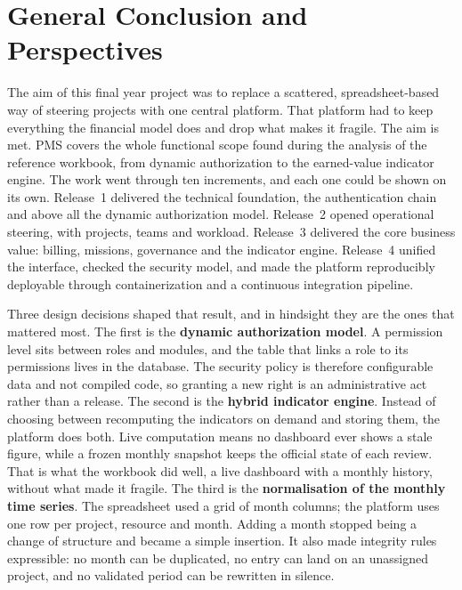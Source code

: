 \chapter*{General Conclusion and Perspectives}

The aim of this final year project was to replace a scattered, spreadsheet-based way of steering
projects with one central platform. That platform had to keep everything the financial model does
and drop what makes it fragile. The aim is met. PMS covers the whole functional scope found during
the analysis of the reference workbook, from dynamic authorization to the earned-value indicator
engine. The work went through ten increments, and each one could be shown on its own. Release~1
delivered the technical foundation, the authentication chain and above all the dynamic
authorization model. Release~2 opened operational steering, with projects, teams and workload.
Release~3 delivered the core business value: billing, missions, governance and the indicator
engine. Release~4 unified the interface, checked the security model, and made the platform
reproducibly deployable through containerization and a continuous integration pipeline.

Three design decisions shaped that result, and in hindsight they are the ones that mattered most.
The first is the \textbf{dynamic authorization model}. A permission level sits between roles and
modules, and the table that links a role to its permissions lives in the database. The security
policy is therefore configurable data and not compiled code, so granting a new right is an
administrative act rather than a release. The second is the \textbf{hybrid indicator engine}.
Instead of choosing between recomputing the indicators on demand and storing them, the platform
does both. Live computation means no dashboard ever shows a stale figure, while a frozen monthly
snapshot keeps the official state of each review. That is what the workbook did well, a live
dashboard with a monthly history, without what made it fragile. The third is the
\textbf{normalisation of the monthly time series}. The spreadsheet used a grid of month columns;
the platform uses one row per project, resource and month. Adding a month stopped being a change
of structure and became a simple insertion. It also made integrity rules expressible: no month can
be duplicated, no entry can land on an unassigned project, and no validated period can be
rewritten in silence.

